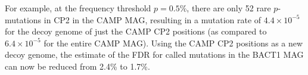 For example, at the frequency threshold $p=0.5$\%, there are only 52 rare $p$-mutations in CP2 in the CAMP MAG, resulting in a mutation rate of $4.4 \times 10^{-5}$ for the decoy genome of just the CAMP CP2 positions (as compared to $6.4 \times 10^{-5}$ for the entire CAMP MAG). Using the CAMP CP2 positions as a new decoy genome, the estimate of the FDR for called mutations in the BACT1 MAG can now be reduced from 2.4\% to 1.7\%.\endinput